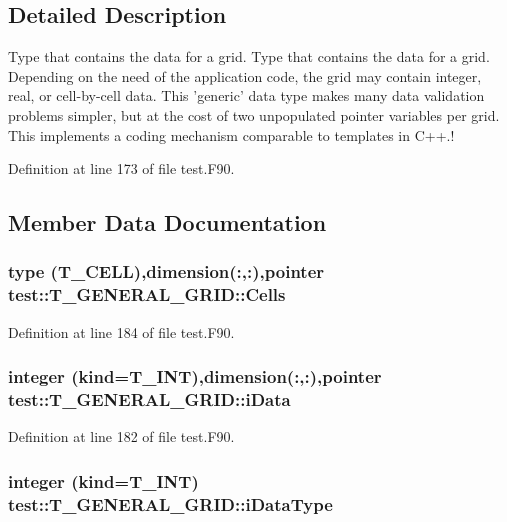 \subsection{Detailed Description}
Type that contains the data for a grid. Type that contains the data for a grid. Depending on the need of the application code, the grid may contain integer, real, or cell-\/by-\/cell data. This 'generic' data type makes many data validation problems simpler, but at the cost of two unpopulated pointer variables per grid. This implements a coding mechanism comparable to templates in C++.! 

Definition at line 173 of file test.F90.



\subsection{Member Data Documentation}
\hypertarget{typetest_1_1_t___g_e_n_e_r_a_l___g_r_i_d_ac9e367fb03b74d49eca1577e132ea89c}{
\subsubsection[{Cells}]{\setlength{\rightskip}{0pt plus 5cm}type ({\bf T\_\-CELL}),dimension(:,:),pointer {\bf test::T\_\-GENERAL\_\-GRID::Cells}}}
\label{typetest_1_1_t___g_e_n_e_r_a_l___g_r_i_d_ac9e367fb03b74d49eca1577e132ea89c}


Definition at line 184 of file test.F90.

\hypertarget{typetest_1_1_t___g_e_n_e_r_a_l___g_r_i_d_a1df76462828d260cc7ea860f42fc401c}{
\subsubsection[{iData}]{\setlength{\rightskip}{0pt plus 5cm}integer (kind={\bf T\_\-INT}),dimension(:,:),pointer {\bf test::T\_\-GENERAL\_\-GRID::iData}}}
\label{typetest_1_1_t___g_e_n_e_r_a_l___g_r_i_d_a1df76462828d260cc7ea860f42fc401c}


Definition at line 182 of file test.F90.

\hypertarget{typetest_1_1_t___g_e_n_e_r_a_l___g_r_i_d_ac0322d5f29700b270476636dc2624cf0}{
\subsubsection[{iDataType}]{\setlength{\rightskip}{0pt plus 5cm}integer (kind={\bf T\_\-INT}) {\bf test::T\_\-GENERAL\_\-GRID::iDataType}}}
\label{typetest_1_1_t___g_e_n_e_r_a_l___g_r_i_d_ac0322d5f29700b270476636dc2624cf0}


